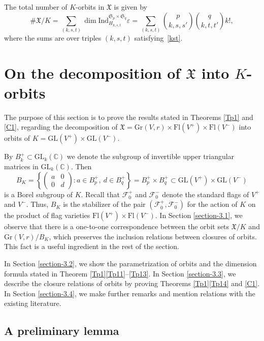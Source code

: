 \documentclass[ALCO,Unicode]{cedram}
\newcommand{\card}[1]{\# #1}
\newcommand{\flag}{\mathcal{F}}
\newcommand{\permutationsof}[1]{\mathfrak{S}_{#1}}
\newcommand{\Xfv}{\mathfrak{X}}
\newcommand{\Grass}{\mathrm{Gr}}
\newcommand{\Flags}{\mathrm{Fl}}
\newcommand{\GL}{\mathrm{GL}}
\newcommand{\mC}{\mathbb{C}}
\begin{document}
\begin{coro}
The total number of $K$-orbits in $\Xfv$ is given by
\[\card\Xfv/K=\sum_{(k,s,t)}\dim \mathrm{Ind}_{H_{k,s,t}}^{\permutationsof{p}\times\permutationsof{q}}\varepsilon=\sum_{(k,s,t)}\binom{p}{k,s,s'}\binom{q}{k,t,t'}k!,\]
where the sums are over triples $(k,s,t)$ satisfying~\eqref{kst}.
\end{coro}

\section{On the decomposition of $\Xfv$ into $K$-orbits}

\label{section-3}

The purpose of this section is to prove the results stated in Theorems \ref{Tp1} and \ref{C1}, regarding the decomposition of $\Xfv=\Grass(V,r)\times\Flags(V^+)\times\Flags(V^-)$ into orbits of $K=\GL(V^+)\times\GL(V^-)$.

By $B_k^+\subset\GL_k(\mC)$ we denote the subgroup of invertible upper triangular matrices in $\GL_k(\mC)$.
Then\[B_K=\left\{\begin{pmatrix}
a & 0\\ 0 & d
\end{pmatrix}:a\in B_p^+,\ d\in B_q^+\right\}=B_p^+\times B_q^+\subset\GL(V^+)\times\GL(V^-)\]
is a Borel subgroup of $K$. Recall that $\flag_0^+$ and $\flag_0^-$ denote the standard flags of $V^+$ and $V^-$. Thus, $B_K$ is the stabilizer of the pair $(\flag_0^+,\flag_0^-)$ for the action of $K$ on the product of flag varieties $\Flags(V^+)\times\Flags(V^-)$.
In Section \ref{section-3.1}, we observe that there is a one-to-one correspondence between the orbit sets $\Xfv/K$ and $\Grass(V,r)/B_K$, which preserves the inclusion relations between closures of orbits. This fact is a useful ingredient in the rest of the section.

In Section \ref{section-3.2}, we show the parametrization of orbits and the dimension formula stated in Theorem \ref{Tp1}\ref{Tp11}--\ref{Tp13}. In Section \ref{section-3.3}, we describe the closure relations of orbits
by proving Theorems \ref{Tp1}\ref{Tp14} and \ref{C1}.
In Section \ref{section-3.4}, we make further remarks and mention relations with the existing literature.


\subsection{A preliminary lemma}
\end{document}
